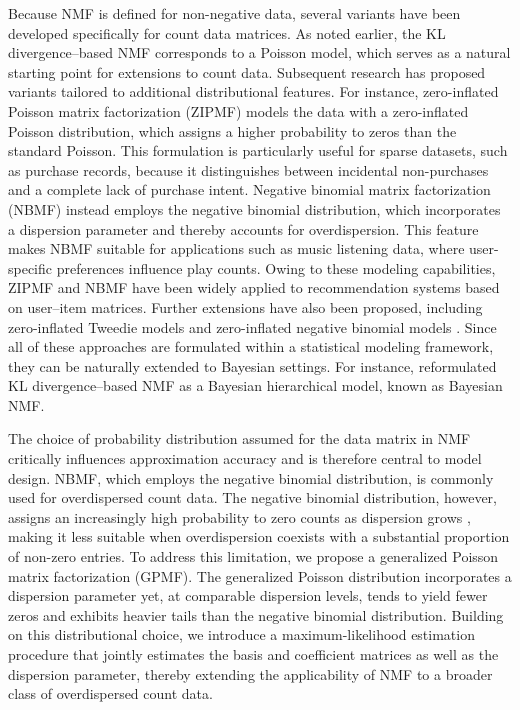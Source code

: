 \documentclass[pdflatex,sn-basic]{sn-jnl}%
\theoremstyle{thmstyleone}%
\theoremstyle{thmstyletwo}%
\theoremstyle{thmstylethree}%
\begin{document}
Because NMF is defined for non-negative data, several variants have been developed specifically for count data matrices.
As noted earlier, the KL divergence–based NMF corresponds to a Poisson model, which serves as a natural starting point for extensions to count data.
Subsequent research has proposed variants tailored to additional distributional features.
For instance, zero-inflated Poisson matrix factorization (ZIPMF) \citep{simchowitz2013zero} models the data with a zero-inflated Poisson distribution, which assigns a higher probability to zeros than the standard Poisson.
This formulation is particularly useful for sparse datasets, such as purchase records, because it distinguishes between incidental non-purchases and a complete lack of purchase intent.
Negative binomial matrix factorization (NBMF) \citep{Gouvert2020} instead employs the negative binomial distribution, which incorporates a dispersion parameter and thereby accounts for overdispersion.
This feature makes NBMF suitable for applications such as music listening data, where user-specific preferences influence play counts.
Owing to these modeling capabilities, ZIPMF and NBMF have been widely applied to recommendation systems based on user–item matrices.
Further extensions have also been proposed, including zero-inflated Tweedie models \citep{Abe2017} and zero-inflated negative binomial models \citep{Abe2018, Abe2019}.
Since all of these approaches are formulated within a statistical modeling framework, they can be naturally extended to Bayesian settings.
For instance, \citet{cemgil2009bayesian} reformulated KL divergence–based NMF as a Bayesian hierarchical model, known as Bayesian NMF.

The choice of probability distribution assumed for the data matrix in NMF critically influences approximation accuracy and is therefore central to model design. NBMF, which employs the negative binomial distribution, is commonly used for overdispersed count data. The negative binomial distribution, however, assigns an increasingly high probability to zero counts as dispersion grows \citep{MINAMI2007210}, making it less suitable when overdispersion coexists with a substantial proportion of non-zero entries. To address this limitation, we propose a generalized Poisson matrix factorization (GPMF). The generalized Poisson distribution \citep{Consul01111973} incorporates a dispersion parameter yet, at comparable dispersion levels, tends to yield fewer zeros and exhibits heavier tails than the negative binomial distribution. Building on this distributional choice, we introduce a maximum-likelihood estimation procedure that jointly estimates the basis and coefficient matrices as well as the dispersion parameter, thereby extending the applicability of NMF to a broader class of overdispersed count data.
\end{document}
